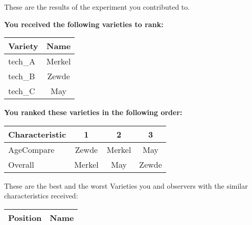 \documentclass[10pt]{article}
\begin{document}
\begin{titlepage}
	These are the results of the experiment you contributed to.

	\begin{flushleft}
		\textbf{You received the following varieties to rank: }\hfill \break
		\begin{tabularx}{\textwidth}{ X | c  }
			\hline
			\textbf{Variety} & \textbf{Name} \\ \hline

			
				tech\_A & Merkel \\ \hline
			
				tech\_B & Zewde \\ \hline
			
				tech\_C & May \\ \hline
			


		\end{tabularx}\newline \newline

		\textbf{You ranked these varieties in the following order: }\hfill \break
		\begin{tabularx}{\textwidth}{ X | c | c | c  }
			\hline
			\textbf{Characteristic}
			
				& \textbf{ 1 }
			
				& \textbf{ 2 }
			
				& \textbf{ 3 }
			
			\\ \hline


			
				AgeCompare & Zewde  & Merkel  & May  \\ \hline


			
				Overall & Merkel  & May  & Zewde  \\ \hline


			

		\end{tabularx}

	\end{flushleft}

	\pagebreak

	\begin{flushleft}
		These are the best and the worst Varieties you and observers with the similar characteristics received:\hfill \break \newline
		\begin{tabularx}{\textwidth}{ X | X  }
			\hline
			\textbf{Position} & \textbf{Name} \\ \hline


\end{tabularx}
\end{flushleft}
\end{titlepage}
\end{document}
